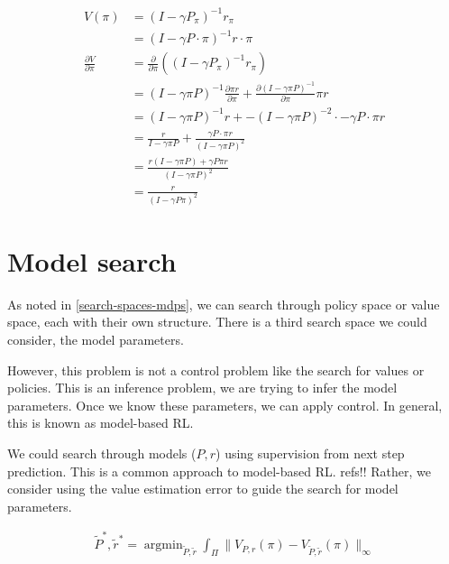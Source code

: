\begin{align*}
V(\pi) &= (I − \gamma P_{\pi})^{−1}r_{\pi} \tag{value functional}\\
&= (I − \gamma P\cdot \pi)^{−1}r\cdot \pi \\
\frac{\partial V}{\partial \pi} &= \frac{\partial}{\partial \pi}((I-\gamma P_{\pi})^{-1} r_{\pi}) \\
&= (I-\gamma \pi P)^{-1} \frac{\partial \pi r}{\partial \pi}+   \frac{\partial (I-\gamma \pi P)^{-1}}{\partial \pi}\pi r\tag{product rule} \\
&= (I-\gamma \pi P)^{-1} r + -(I-\gamma \pi P)^{-2} \cdot -\gamma P\cdot \pi r\\
&= \frac{r}{I-\gamma \pi P} + \frac{ \gamma P\cdot \pi r}{(I-\gamma \pi P)^2} \tag{rewrite as fractions}\\
&= \frac{r(I-\gamma \pi P) + \gamma P \pi r}{(I-\gamma \pi P)^2} \tag{common demoninator}\\
& = \frac{r}{(I-\gamma P \pi)^2} \tag{cancel}
\end{align*}

\newpage
\section{Model search} \label{model-iteration}

As noted in \ref{search-spaces-mdps}, we can search through policy space or value
space, each with their own structure.
There is a third search space we could consider, the model parameters.

However, this problem is not a control problem like the search for values or policies.
This is an inference problem, we are trying to infer the model parameters.
Once we know these parameters, we can apply control.
In general, this is known as model-based RL.

We could search through models ($P, r$) using supervision from next step prediction.
This is a common approach to model-based RL. {\color{red}refs!!}
Rather, we consider using the value estimation error to guide the search for model parameters.

\begin{align}
\tilde P^{* }, \tilde r^{* } = \mathop{\text{argmin}}_{\tilde P, \tilde r} \int_{\Pi} \parallel V_{P, r}(\pi)-V_{\tilde P, \tilde r}(\pi) \parallel_\infty
\end{align}

